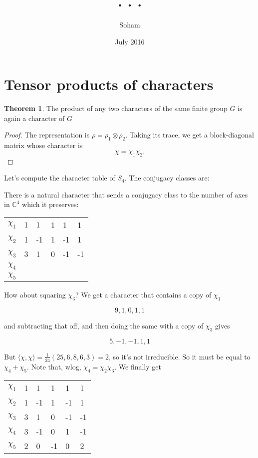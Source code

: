\documentclass{article}
\title{. . .}
\author{Soham}
\date{July 2016}
\newcommand{\C}{\mathbb C}
\newcommand{\bkt}[1]{\langle #1 \rangle}
\theoremstyle{definition}
\newtheorem*{thm}{Theorem}
\begin{document}
\maketitle
 
\section{Tensor products of characters}
\begin{thm}
 The product of any two characters of the same finite group $G$ is again a
 character of $G$
\end{thm}
\begin{proof}
  The representation is $\rho = \rho_1\otimes\rho_2$. Taking its trace, we get a
  block-diagonal matrix whose character is
  $$\chi = \chi_1\chi_2.$$
\end{proof}

Let's compute the character table of $S_4$. The conjugacy classes are:

There is a natural character that sends a conjugacy class to the number of axes
in $\C^4$ which it preserves:

\begin{tabular}{l|lllll}
 $\chi_1$ &$1$  &$1$  &1  &1  &1 \\
 $\chi_2$ &1  &-1  &1  &-1   &1 \\
 $\chi_3$ &3  &1  &0   &-1 &-1 \\
 $\chi_4$ &  &  & & & \\ 
 $\chi_5$ &  &  & & &
\end{tabular}

How about squaring $\chi_3$? We get a character that contains a copy of $\chi_1$

$$9,1,0,1,1$$

and subtracting that off, and then doing the same with a copy of $\chi_3$ gives

$$5,-1,-1,1,1$$

But $\bkt{\chi,\chi} = \frac1{24}(25,6,8,6,3)=2$, so it's not irreducible. So it
must be equal to $\chi_4+\chi_5$. Note that, wlog, $\chi_4=\chi_2\chi_3$. We
finally get

\begin{tabular}{llllll}
 $\chi_1$ &1  &1  &1  &1  &1 \\
$\chi_2$  &1  &-1  &1  &-1   &1 \\
$\chi_3$  &3  &1  &0   &-1 &-1 \\
$\chi_4$  &3  &-1  &0  &1 &-1 \\ 
$\chi_5$  &2  &0  &-1  &0 &2
\end{tabular}
\end{document}
